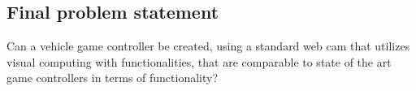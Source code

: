 \subsection{Final problem statement}
Can a vehicle game controller be created, using a standard web cam that utilizes visual computing with functionalities, that are comparable to state of the art game controllers in terms of functionality?